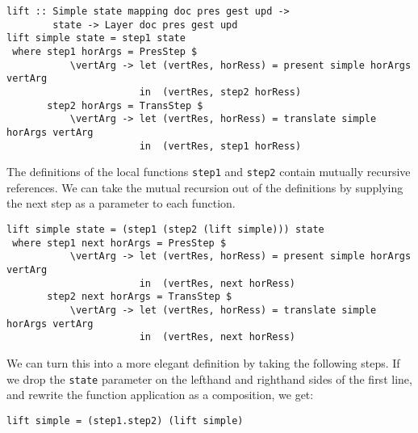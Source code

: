 \begin{small}
\begin{verbatim}
lift :: Simple state mapping doc pres gest upd ->
        state -> Layer doc pres gest upd
lift simple state = step1 state 
 where step1 horArgs = PresStep $ 
           \vertArg -> let (vertRes, horRess) = present simple horArgs vertArg                                         
                       in  (vertRes, step2 horRess)
       step2 horArgs = TransStep $
           \vertArg -> let (vertRes, horRess) = translate simple horArgs vertArg                     
                       in  (vertRes, step1 horRess)
\end{verbatim}
\end{small}

The definitions of the local functions \texttt{step1} and \texttt{step2} contain mutually recursive references. We can take the mutual recursion out of the definitions by supplying the next step as a parameter to each function.  

      
\begin{small}
\begin{verbatim}
lift simple state = (step1 (step2 (lift simple))) state 
 where step1 next horArgs = PresStep $ 
           \vertArg -> let (vertRes, horRess) = present simple horArgs vertArg                                         
                       in  (vertRes, next horRess)
       step2 next horArgs = TransStep $
           \vertArg -> let (vertRes, horRess) = translate simple horArgs vertArg                     
                       in  (vertRes, next horRess)
\end{verbatim}
\end{small}

We can turn this into a more elegant definition by taking the following steps. If we drop the \texttt{state} parameter  on the lefthand and righthand sides of the first line, and rewrite the function application as a composition, we get:

\begin{small}
\begin{verbatim}
lift simple = (step1.step2) (lift simple)
\end{verbatim}
\end{small}

